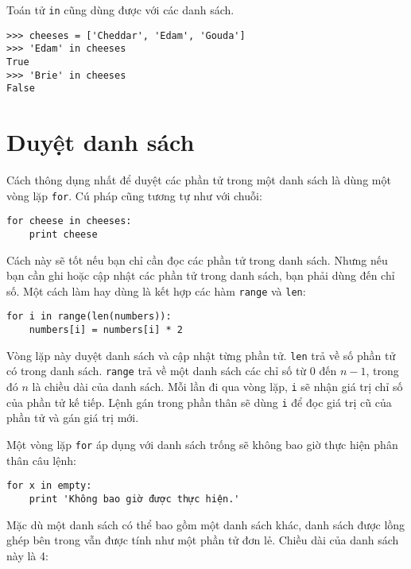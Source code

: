 \documentclass[11pt]{book}
\begin{document}
Toán tử {\tt in} cũng dùng được với các danh sách.

\beforeverb
\begin{verbatim}
>>> cheeses = ['Cheddar', 'Edam', 'Gouda']
>>> 'Edam' in cheeses
True
>>> 'Brie' in cheeses
False
\end{verbatim}
\afterverb


\section{Duyệt danh sách}

Cách thông dụng nhất để duyệt các phần tử trong một danh sách
là dùng một vòng lặp {\tt for}.  Cú pháp cũng tương tự như với
chuỗi:

\beforeverb
\begin{verbatim}
for cheese in cheeses:
    print cheese
\end{verbatim}
\afterverb
%
Cách này sẽ tốt nếu bạn chỉ cần đọc các phần tử trong danh sách.
Nhưng nếu bạn cần ghi hoặc cập nhật các phần tử trong danh sách,
bạn phải dùng đến chỉ số. Một cách làm hay dùng là kết hợp các
hàm {\tt range} và {\tt len}:


\beforeverb
\begin{verbatim}
for i in range(len(numbers)):
    numbers[i] = numbers[i] * 2
\end{verbatim}
\afterverb
%
Vòng lặp này duyệt danh sách và cập nhật từng phần tử.  {\tt len}
trả về số phần tử có trong danh sách. {\tt range} trả về một
danh sách các chỉ số từ 0 đến $n-1$, trong đó $n$ là chiều dài
của danh sách. Mỗi lần đi qua vòng lặp, {\tt i} sẽ nhận giá trị
chỉ số của phần tử kế tiếp. Lệnh gán trong phần thân sẽ dùng 
{\tt i} để đọc giá trị cũ của phần tử và gán giá trị mới.


Một vòng lặp {\tt for} áp dụng với danh sách trống sẽ không bao giờ
thực hiện phân thân câu lệnh:

\beforeverb
\begin{verbatim}
for x in empty:
    print 'Không bao giờ được thực hiện.'
\end{verbatim}
\afterverb
%
Mặc dù một danh sách có thể bao gồm một danh sách khác, danh sách
được lồng ghép bên trong vẫn được tính như một phần tử đơn lẻ. 
Chiều dài của danh sách này là 4:
\end{document}

